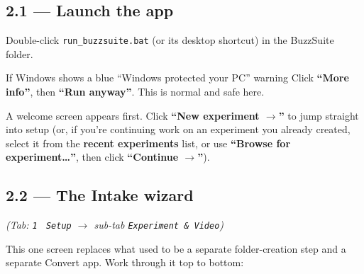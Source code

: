 \documentclass[11pt,a4paper]{article}
\begin{document}
\subsection*{2.1 --- Launch the app}

Double-click \texttt{run\_buzzsuite.bat} (or its desktop shortcut) in the BuzzSuite folder.

\begin{tipbox}{If Windows shows a blue ``Windows protected your PC'' warning}
Click \textbf{``More info''}, then \textbf{``Run anyway''}. This is normal and
safe here.
\end{tipbox}

A welcome screen appears first. Click \textbf{``New experiment $\rightarrow$''} to jump straight
into setup (or, if you're continuing work on an experiment you already created, select it from the
\textbf{recent experiments} list, or use \textbf{``Browse for experiment\ldots''}, then click
\textbf{``Continue $\rightarrow$''}).

\subsection*{2.2 --- The Intake wizard}
\textit{(Tab: \texttt{1} \textperiodcentered\ \texttt{Setup} $\to$ sub-tab \texttt{Experiment \& Video})}

This one screen replaces what used to be a separate folder-creation step and a separate Convert
app. Work through it top to bottom:
\end{document}
